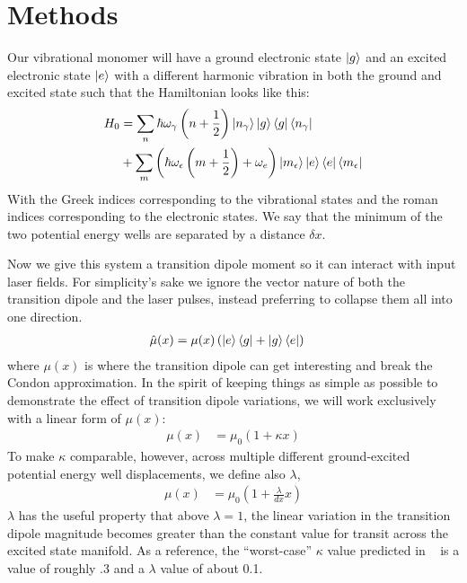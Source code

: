 \section{Methods}

Our vibrational monomer will have a ground electronic state $\ket{g}$ and an excited electronic state $\ket{e}$ with a different harmonic vibration in both the ground and excited state such that the Hamiltonian looks like this:
\begin{align}
	H_0 &=  \sum_n \hbar \omega_{\gamma}  \left(n + \frac{1}{2} \right)  \ket{n_{\gamma}}\ket{g}\bra{g} \bra{n_{\gamma}} \\
   &+ \sum_m \left(  \hbar \omega_{\epsilon}  \left(m + \frac{1}{2} \right) + \omega_e \right)  \ket{m_{\epsilon}} \ket{e}\bra{e} \bra{m_{\epsilon}}
\end{align}
With the Greek indices corresponding to the vibrational states and the roman indices corresponding to the electronic states.  We say that the minimum of the two potential energy wells are separated by a distance $\delta x$.

Now we give this system a transition dipole moment so it can interact with input laser fields.  For simplicity's sake we ignore the vector nature of both the transition dipole and the laser pulses, instead preferring to collapse them all into one direction.
\begin{align}
	\hat{\mu}(x) &= \mu (x)  \left( \ket{e}\bra{g} + \ket{g} \bra{e} \right)
\end{align}
where $\mu (x)$ is where the transition dipole can get interesting and break the Condon approximation.  In the spirit of keeping things as simple as possible to demonstrate the effect of transition dipole variations, we will work exclusively with a linear form of $\mu(x)$:
\begin{align}
	\mu(x) &= \mu_0\left( 1 +  \kappa x \right)
\end{align}
To make $\kappa$ comparable, however, across multiple different ground-excited potential energy well displacements, we define also $\lambda$,
\begin{align}
	\mu(x) &= \mu_0\left( 1 +  \frac{\lambda}{ dx }x \right)
\end{align}
$\lambda$ has the useful property that above $\lambda=1$, the linear variation in the transition dipole magnitude becomes greater than the constant value for transit across the excited state manifold.  As a reference, the ``worst-case'' $\kappa$ value predicted in ~\cite{photosyntheticKappa} is a value of roughly .3 and a $\lambda$ value of about 0.1.


